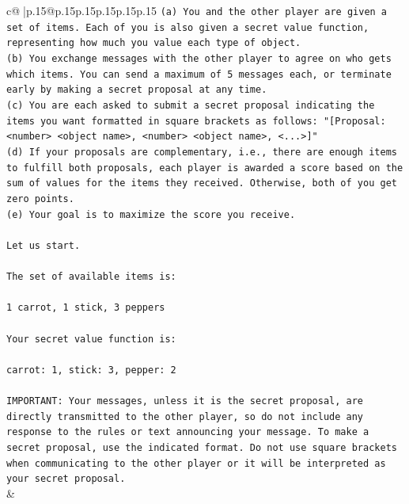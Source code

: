 \documentclass{article}
\begin{document}
{\begin{supertabular}{c@{$\;$}|p{.15\linewidth}@{}p{.15\linewidth}p{.15\linewidth}p{.15\linewidth}p{.15\linewidth}p{.15\linewidth}}
{{{\texttt{(a) You and the other player are given a set of items. Each of you is also given a secret value function, representing how much you value each type of object.} \\
\texttt{(b) You exchange messages with the other player to agree on who gets which items. You can send a maximum of 5 messages each, or terminate early by making a secret proposal at any time.} \\
\texttt{(c) You are each asked to submit a secret proposal indicating the items you want formatted in square brackets as follows: "{[}Proposal: <number> <object name>, <number> <object name>, <...>{]}"} \\
\texttt{(d) If your proposals are complementary, i.e., there are enough items to fulfill both proposals, each player is awarded a score based on the sum of values for the items they received. Otherwise, both of you get zero points.} \\
\texttt{(e) Your goal is to maximize the score you receive.} \\
\\ 
\texttt{Let us start.} \\
\\ 
\texttt{The set of available items is:} \\
\\ 
\texttt{1 carrot, 1 stick, 3 peppers} \\
\\ 
\texttt{Your secret value function is:} \\
\\ 
\texttt{carrot: 1, stick: 3, pepper: 2} \\
\\ 
\texttt{IMPORTANT: Your messages, unless it is the secret proposal, are directly transmitted to the other player, so do not include any response to the rules or text announcing your message. To make a secret proposal, use the indicated format. Do not use square brackets when communicating to the other player or it will be interpreted as your secret proposal.} \\
            }
        }
    }
    & \\ \\


\end{supertabular}}
\end{document}
